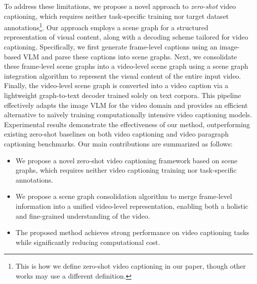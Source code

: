 To address these limitations, we propose a novel approach to \textit{zero-shot} video captioning, which requires neither task-specific training nor target dataset annotations\footnote{This is how we define zero-shot video captioning in our paper, though other works may use a different definition.}.
Our approach employs a scene graph for a structured representation of visual content, along with a decoding scheme tailored for video captioning.
Specifically, we first generate frame-level captions using an image-based VLM and parse these captions into scene graphs. 
Next, we consolidate these frame-level scene graphs into a video-level scene graph using a scene graph integration algorithm to represent the visual content of the entire input video.
Finally, the video-level scene graph is converted into a video caption via a lightweight graph-to-text decoder trained solely on text corpora. 
This pipeline effectively adapts the image VLM for the video domain and provides an efficient alternative to na\"ively training computationally intensive video captioning models.
Experimental results demonstrate the effectiveness of our method, outperforming existing zero-shot baselines on both video captioning and video paragraph captioning benchmarks.
Our main contributions are summarized as follows: 
%
\vspace{-4mm}
\begin{itemize}
	\item We propose a novel zero-shot video captioning framework based on scene graphs, which requires neither video captioning training nor task-specific annotations. 
	\item We propose a scene graph consolidation algorithm to merge frame-level information into a unified video-level representation, enabling both a holistic and fine-grained understanding of the video.
	\item The proposed method achieves strong performance on video captioning tasks while significantly reducing computational cost.
\end{itemize}
